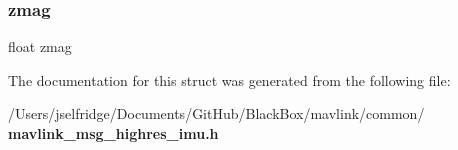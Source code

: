 \mbox{\label{struct____mavlink__highres__imu__t_a0f01fcd982ec22d4b412dbd735e9ab72}} 
\subsubsection{zmag}
{\footnotesize\ttfamily float zmag}



The documentation for this struct was generated from the following file\+:\begin{DoxyCompactItemize}
\item 
/\+Users/jselfridge/\+Documents/\+Git\+Hub/\+Black\+Box/mavlink/common/\textbf{ mavlink\+\_\+msg\+\_\+highres\+\_\+imu.\+h}\end{DoxyCompactItemize}
